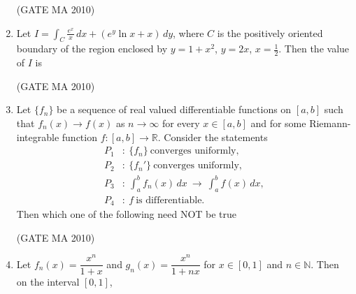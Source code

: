 \documentclass[journal,12pt,onecolumn]{IEEEtran}
\theoremstyle{remark}
\begin{document}
\begin{flushleft}
\begin{enumerate}
\hfill(GATE MA 2010)

\begin{enumerate}
\end{enumerate}

\item Let $I=\displaystyle\int_C \frac{e^x}{x}\,dx+\left(e^y\ln x+x\right)\,dy$, where $C$ is the positively oriented boundary of the region enclosed by $y=1+x^2$, $y=2x$, $x=\tfrac12$. Then the value of $I$ is

\hfill(GATE MA 2010)

\begin{enumerate}
\end{enumerate}
\item Let $\{f_n\}$ be a sequence of real valued differentiable functions on $[a,b]$ such that $f_n(x)\to f(x)$ as $n\to\infty$ for every $x\in[a,b]$ and for some Riemann-integrable function $f:[a,b]\to\mathbb{R}$. Consider the statements
\begin{align*}
P_1&:\ \{f_n\}\ \text{converges uniformly},\\
P_2&:\ \{f_n'\}\ \text{converges uniformly},\\
P_3&:\ \int_a^b f_n(x)\,dx\ \to\ \int_a^b f(x)\,dx,\\
P_4&:\ f\ \text{is differentiable}.
\end{align*}
Then which one of the following need NOT be true

\hfill(GATE MA 2010)

\begin{enumerate}
\end{enumerate}
\item Let $f_n(x)=\dfrac{x^n}{1+x}$ and $g_n(x)=\dfrac{x^n}{1+n x}$ for $x\in[0,1]$ and $n\in\mathbb{N}$. Then on the interval $[0,1]$,


\end{enumerate}
\end{flushleft}
\end{document}
